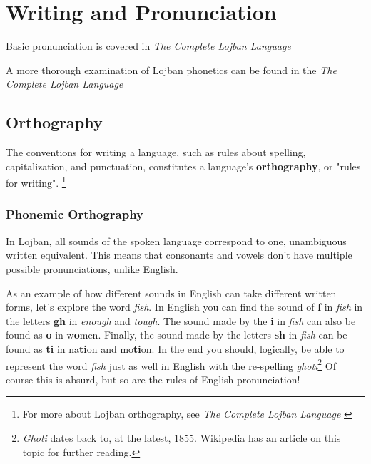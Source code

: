 \documentclass[12pt]{book}
\begin{document}

\section{Writing and Pronunciation}

Basic pronunciation is covered in \emph{The Complete Lojban Language} \cite[Chapter 2, p.~16]{CLL}

A more thorough examination of Lojban phonetics can be found in the \emph{The Complete Lojban Language} \cite[Chapter 3, p.~34]{CLL}

\subsection{Orthography}

The conventions for writing a language, such as rules about spelling, capitalization, and punctuation, constitutes a language's \textbf{orthography}, or "rules for writing". \footnote{For more about Lojban orthography, see \emph{The Complete Lojban Language} \cite[Chapter 3, p.~33]{CLL} }

\subsubsection{Phonemic Orthography}


In Lojban, all sounds of the spoken language correspond to one, unambiguous written equivalent. This means that consonants and vowels don't have multiple possible pronunciations, unlike English. 

As an example of how different sounds in English can take different written forms, let's explore the word \emph{fish}. In English you can find the sound of \textbf{f} in \emph{fish} in the letters \textbf{gh} in \emph{enough} and \emph{tough}. The sound made by the \textbf{i} in \emph{fish} can also be found as \textbf{o} in w\textbf{o}men. Finally, the sound made by the letters \textbf{sh} in \emph{fish} can be found as \textbf{ti} in na\textbf{ti}on and mo\textbf{ti}on. In the end you should, logically, be able to represent the word \emph{fish} just as well in English with the re-spelling \emph{ghoti}\footnote{\emph{Ghoti} dates back to, at the latest, 1855. Wikipedia has an \href{https://en.wikipedia.org/wiki/Ghoti}{article} on this topic for further reading.} Of course this is absurd, but so are the rules of English pronunciation!
\end{document}
